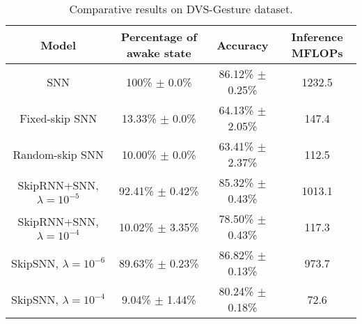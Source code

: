 \begin{table*}[t!]
\centering
\caption{Comparative results on DVS-Gesture dataset.}
\vspace{-5pt}
\label{tab:dvs}
\begin{tabular}{cccc}
\hline
{Model} & {Percentage of awake state} & {Accuracy}&{Inference MFLOPs}\\
\hline
{SNN}    & 100\% $\pm$ 0.0\% & 86.12\% $\pm$ 0.25\% & 1232.5 \\ {Fixed-skip SNN}    & 13.33\% $\pm$ 0.0\% & 64.13\% $\pm$ 2.05\% & 147.4 \\
{Random-skip SNN}    & 10.00\% $\pm$ 0.0\% & 63.41\% $\pm$ 2.37\% & 112.5 \\
{SkipRNN+SNN, $\lambda=10^{-5}$}    & 92.41\% $\pm$ 0.42\% & 85.32\% $\pm$ 0.43\% & 1013.1 \\
{SkipRNN+SNN, $\lambda=10^{-4}$}    & 10.02\% $\pm$ 3.35\% & 78.50\% $\pm$ 0.43\% & 117.3 \\
\hline
{SkipSNN, $\lambda=10^{-6}$}    & 89.63\% $\pm$ 0.23\% & 86.82\% $\pm$ 0.13\% & 973.7 \\
{SkipSNN, $\lambda=10^{-4}$}    & 9.04\% $\pm$ 1.44\% & 80.24\% $\pm$ 0.18\% & 72.6 \\
\hline
\end{tabular}
\vspace{-5pt}
\end{table*}